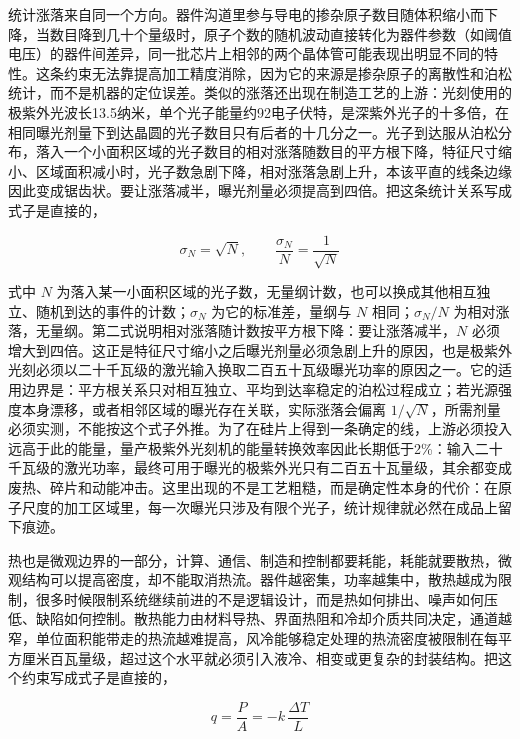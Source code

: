统计涨落来自同一个方向。器件沟道里参与导电的掺杂原子数目随体积缩小而下降，当数目降到几十个量级时，原子个数的随机波动直接转化为器件参数（如阈值电压）的器件间差异，同一批芯片上相邻的两个晶体管可能表现出明显不同的特性。这条约束无法靠提高加工精度消除，因为它的来源是掺杂原子的离散性和泊松统计，而不是机器的定位误差。类似的涨落还出现在制造工艺的上游：光刻使用的极紫外光波长13.5纳米，单个光子能量约92电子伏特，是深紫外光子的十多倍，在相同曝光剂量下到达晶圆的光子数目只有后者的十几分之一。光子到达服从泊松分布，落入一个小面积区域的光子数目的相对涨落随数目的平方根下降，特征尺寸缩小、区域面积减小时，光子数急剧下降，相对涨落急剧上升，本该平直的线条边缘因此变成锯齿状。要让涨落减半，曝光剂量必须提高到四倍。把这条统计关系写成式子是直接的，

\begin{equation}
\sigma_{N}=\sqrt{N},
\qquad
\frac{\sigma_{N}}{N}=\frac{1}{\sqrt{N}}
\end{equation}

式中 $N$ 为落入某一小面积区域的光子数，无量纲计数，也可以换成其他相互独立、随机到达的事件的计数；$\sigma_{N}$ 为它的标准差，量纲与 $N$ 相同；$\sigma_{N}/N$ 为相对涨落，无量纲。第二式说明相对涨落随计数按平方根下降：要让涨落减半，$N$ 必须增大到四倍。这正是特征尺寸缩小之后曝光剂量必须急剧上升的原因，也是极紫外光刻必须以二十千瓦级的激光输入换取二百五十瓦级曝光功率的原因之一。它的适用边界是：平方根关系只对相互独立、平均到达率稳定的泊松过程成立；若光源强度本身漂移，或者相邻区域的曝光存在关联，实际涨落会偏离 $1/\sqrt{N}$，所需剂量必须实测，不能按这个式子外推。为了在硅片上得到一条确定的线，上游必须投入远高于此的能量，量产极紫外光刻机的能量转换效率因此长期低于2\%：输入二十千瓦级的激光功率，最终可用于曝光的极紫外光只有二百五十瓦量级，其余都变成废热、碎片和动能冲击。\cite{debisschop2018stochastic}这里出现的不是工艺粗糙，而是确定性本身的代价：在原子尺度的加工区域里，每一次曝光只涉及有限个光子，统计规律就必然在成品上留下痕迹。


热也是微观边界的一部分，计算、通信、制造和控制都要耗能，耗能就要散热，微观结构可以提高密度，却不能取消热流。器件越密集，功率越集中，散热越成为限制，很多时候限制系统继续前进的不是逻辑设计，而是热如何排出、噪声如何压低、缺陷如何控制。散热能力由材料导热、界面热阻和冷却介质共同决定，通道越窄，单位面积能带走的热流越难提高，风冷能够稳定处理的热流密度被限制在每平方厘米百瓦量级，超过这个水平就必须引入液冷、相变或更复杂的封装结构。把这个约束写成式子是直接的，

\begin{equation}
q=\frac{P}{A}=-k\,\frac{\Delta T}{L}
\end{equation}

